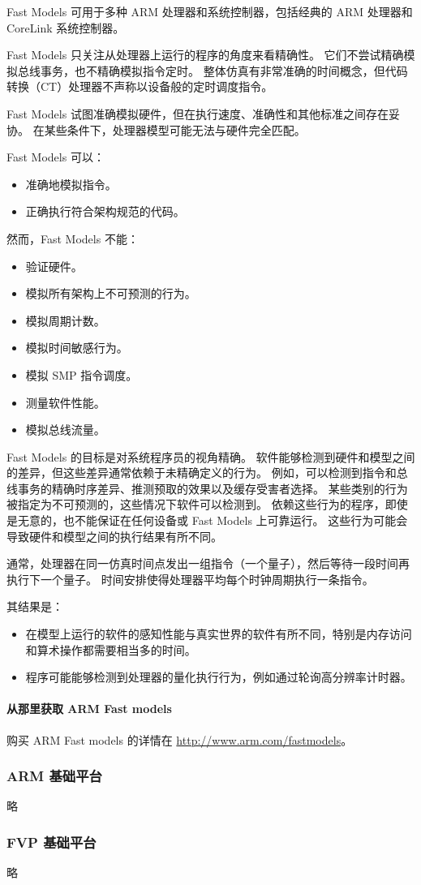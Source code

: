 Fast Models 可用于多种 ARM 处理器和系统控制器，包括经典的 ARM 处理器和
CoreLink 系统控制器。

Fast Models 只关注从处理器上运行的程序的角度来看精确性。
它们不尝试精确模拟总线事务，也不精确模拟指令定时。
整体仿真有非常准确的时间概念，但代码转换（CT）处理器不声称以设备般的定时调度指令。

Fast Models 试图准确模拟硬件，但在执行速度、准确性和其他标准之间存在妥协。
在某些条件下，处理器模型可能无法与硬件完全匹配。

Fast Models 可以：

\begin{itemize}
\item
  准确地模拟指令。
\item
  正确执行符合架构规范的代码。
\end{itemize}

然而，Fast Models 不能：

\begin{itemize}
\item
  验证硬件。
\item
  模拟所有架构上不可预测的行为。
\item
  模拟周期计数。
\item
  模拟时间敏感行为。
\item
  模拟 SMP 指令调度。
\item
  测量软件性能。
\item
  模拟总线流量。
\end{itemize}

Fast Models 的目标是对系统程序员的视角精确。
软件能够检测到硬件和模型之间的差异，但这些差异通常依赖于未精确定义的行为。
例如，可以检测到指令和总线事务的精确时序差异、推测预取的效果以及缓存受害者选择。
某些类别的行为被指定为不可预测的，这些情况下软件可以检测到。
依赖这些行为的程序，即使是无意的，也不能保证在任何设备或
Fast Models 上可靠运行。
这些行为可能会导致硬件和模型之间的执行结果有所不同。

通常，处理器在同一仿真时间点发出一组指令（一个量子），然后等待一段时间再执行下一个量子。
时间安排使得处理器平均每个时钟周期执行一条指令。

其结果是：

\begin{itemize}
\item
  在模型上运行的软件的感知性能与真实世界的软件有所不同，特别是内存访问和算术操作都需要相当多的时间。
\item
  程序可能能够检测到处理器的量化执行行为，例如通过轮询高分辨率计时器。
\end{itemize}

\paragraph*{从那里获取 ARM Fast models}

购买 ARM Fast models 的详情在 \url{http://www.arm.com/fastmodels}。

\subsubsection{ARM 基础平台}

略

\subsubsection{FVP 基础平台}

略
